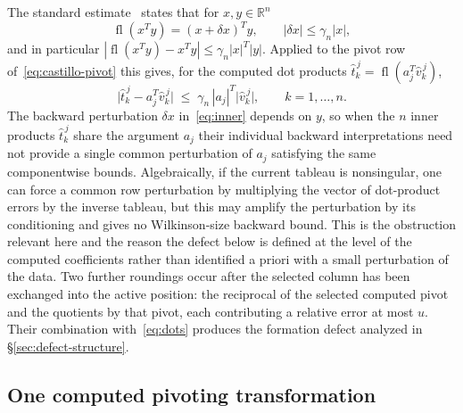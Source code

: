 \documentclass[review,onefignum,onetabnum]{siamart251216}
\newcommand{\fl}{\operatorname{fl}}
\newcommand{\R}{\mathbb{R}}
\begin{document}
The standard estimate~\cite[Lem.~3.1, Eq.~(3.4)]{Higham2002} states that for $x,y\in\R^n$
%
\begin{equation}\label{eq:inner}
\fl(x^Ty) = (x+\delta x)^Ty, \qquad |\delta x| \le \gamma_n |x|,
\end{equation}
%
and in particular $|\fl(x^Ty)-x^Ty| \le \gamma_n |x|^T|y|$. Applied to the pivot row
of~\eqref{eq:castillo-pivot} this gives, for the computed dot products
$\hat t^{\,j}_k = \fl(a_j^T\widehat v^{\,j}_k)$,
%
\begin{equation}\label{eq:dots}
\bigl|\hat t^{\,j}_k - a_j^T\widehat v^{\,j}_k\bigr|
\;\le\;
\gamma_n\,|a_j|^T\bigl|\widehat v^{\,j}_k\bigr|,
\qquad k=1,\dots,n .
\end{equation}
%
The backward perturbation $\delta x$ in~\eqref{eq:inner} depends on $y$, so when the $n$ inner
products $\hat t^{\,j}_k$ share the argument $a_j$ their individual backward interpretations
need not provide a single common perturbation of $a_j$ satisfying the same componentwise bounds.
Algebraically, if the current tableau is nonsingular, one can force a common row perturbation by
multiplying the vector of dot-product errors by the inverse tableau, but this may amplify the
perturbation by its conditioning and gives no Wilkinson-size backward bound. This is the
obstruction relevant here and the reason the defect below is defined at the level of the computed
coefficients rather than identified a priori with a small perturbation of the data. Two further
roundings occur after the selected column has been exchanged into the active position: the
reciprocal of the selected computed pivot and the quotients by that pivot, each contributing a
relative error at most $u$. Their combination with~\eqref{eq:dots} produces the formation defect
analyzed in \S\ref{sec:defect-structure}.

\subsection{One computed pivoting transformation}
\label{sec:onestep}
\end{document}
